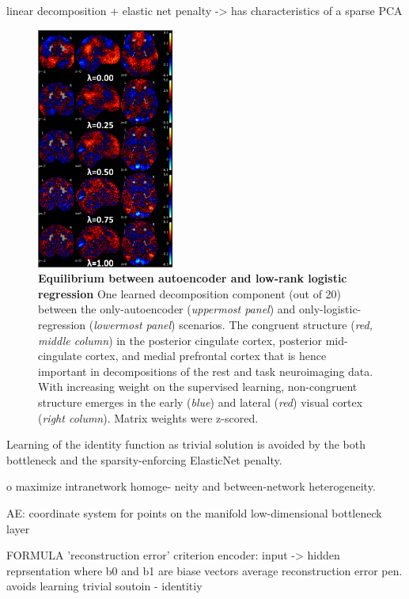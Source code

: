 \documentclass{article} %
\begin{document}
linear decomposition + elastic net penalty -> has characteristics of a
sparse PCA
\begin{figure}
  \begin{center}
    \includegraphics[width=0.40\textwidth]{figures/figure3.png}
  \end{center}
  \caption {\textbf{Equilibrium between autoencoder and low-rank logistic regression}
  One learned decomposition component (out of 20) between the only-autoencoder
  (\textit{uppermost panel}) and only-logistic-regression
  (\textit{lowermost panel}) scenarios.
  The congruent structure (\textit{red, middle column})
  in the
  posterior cingulate cortex, posterior mid-cingulate cortex, and medial
  prefrontal cortex that is hence important in decompositions of the rest and
  task neuroimaging data. With increasing weight on the supervised learning,
  non-congruent structure emerges in the early (\textit{blue}) and
  lateral (\textit{red}) visual cortex
  (\textit{right column}). Matrix weights were z-scored.
  }
\end{figure}

Learning of the identity function as trivial solution is avoided by
the both bottleneck and the sparsity-enforcing ElasticNet penalty.

o maximize intranetwork homoge- neity and between-network heterogeneity. 


AE:
coordinate system for points on the manifold
low-dimensional bottleneck layer

FORMULA
'reconstruction error' criterion
encoder: input -> hidden reprsentation
where b0 and b1 are biase vectors
average reconstruction error
pen. avoids learning trivial soutoin - identitiy
\end{document}
